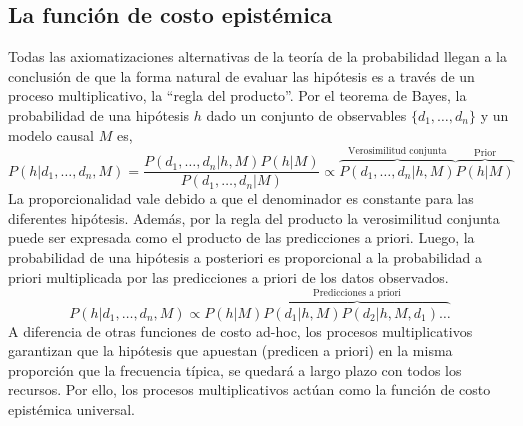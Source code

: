 \documentclass[a4paper,10pt]{book}
\theoremstyle{definition}
\begin{document}

\subsection{La funci\'on de costo epist\'emica}

% 
Todas las axiomatizaciones alternativas de la teor\'ia de la probabilidad llegan a la conclusi\'on de que la forma natural de evaluar las hip\'otesis es a trav\'es de un proceso multiplicativo, la ``regla del producto''.
%
Por el teorema de Bayes, la probabilidad de una hip\'otesis $h$ dado un conjunto de observables $\{d_1, \dots, d_n \}$ y un modelo causal $M$ es,
%
\begin{equation}
P(h|d_1, \dots, d_n, M) = \frac{P(d_1, \dots, d_n|h, M) P(h|M)}{P(d_1, \dots, d_n| M)} \propto \overbrace{P(d_1, \dots, d_n|h, M)}^{\text{Verosimilitud conjunta}} \overbrace{P(h|M)}^{\text{Prior}}
\end{equation}
%
La proporcionalidad vale debido a que el denominador es constante para las diferentes hip\'otesis.
%
Además, por la regla del producto la verosimilitud conjunta puede ser expresada como el producto de las predicciones a priori.
%
Luego, la probabilidad de una hip\'otesis a posteriori es proporcional a la probabilidad a priori multiplicada por las predicciones a priori de los datos observados.
%
\begin{equation}
P(h|d_1, \dots, d_n, M) \propto P(h|M) \overbrace{P(d_1|h,M) P(d_2|h,M,d_1) \dots }^{\text{Predicciones a priori}}
\end{equation}
%
A diferencia de otras funciones de costo ad-hoc, los procesos multiplicativos garantizan que la hip\'otesis que apuestan (predicen a priori) en la misma proporci\'on que la frecuencia t\'ipica, se quedar\'a a largo plazo con todos los recursos.
%
Por ello, los procesos multiplicativos actúan como la funci\'on de costo epistémica universal.
\end{document}
